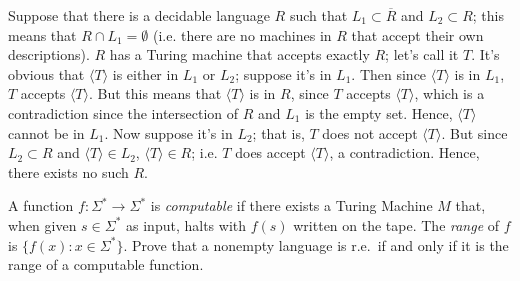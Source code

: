 \documentclass[solution, letterpaper]{cs121}
\begin{document}
\begin{solution}
Suppose that there is a decidable language $R$ such that $L_1 \subset \overline{R}$ and $L_2 \subset R$; this means that $R \cap L_1 = \emptyset$ (i.e. there are no machines in $R$ that accept their own descriptions).  $R$ has a Turing machine that accepts exactly $R$; let's call it $T$.  It's obvious that $\langle T \rangle$ is either in $L_1$ or $L_2$; suppose it's in $L_1$.  Then since $\langle T \rangle$ is in $L_1$, $T$ accepts $\langle T \rangle$.  But this means that $\langle T \rangle$ is in $R$, since $T$ accepts $\langle T \rangle$, which is a contradiction since the intersection of $R$ and $L_1$ is the empty set.  Hence, $\langle T \rangle$ cannot be in $L_1$.  Now suppose it's in $L_2$; that is, $T$ does not accept $\langle T \rangle$.  But since $L_2 \subset R$ and $\langle T \rangle \in L_2$, $\langle T \rangle \in R$; i.e. $T$ does accept $\langle T \rangle$, a contradiction.  Hence, there exists no such $R$.
\end{solution}

A function $f:\Sigma^* \rightarrow \Sigma^*$ is {\it computable} if
there exists a Turing Machine $M$ that, when given $s \in \Sigma^*$ as input,
halts with $f(s)$ written on the tape. The \emph{range} of $f$ is $\{f(x):
  x \in \Sigma^*\}$. Prove that a nonempty language is r.e.~if and only if 
  it is the range of a computable function. 
\end{document}
